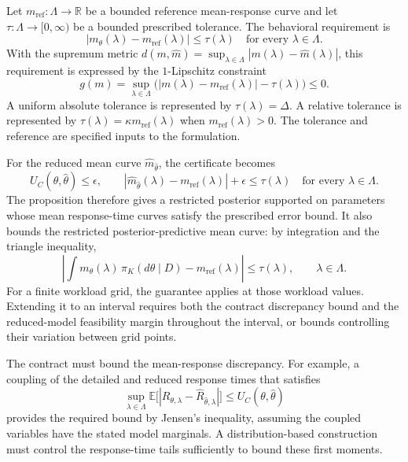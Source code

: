 Let $m_{\mathrm{ref}}:\Lambda\to\mathbb R$ be a bounded reference
mean-response curve and let $\tau:\Lambda\to[0,\infty)$ be a bounded
prescribed tolerance.
The behavioral requirement is
\[
 |m_\theta(\lambda)-m_{\mathrm{ref}}(\lambda)|\leq\tau(\lambda)
 \quad\text{for every }\lambda\in\Lambda.
\]
With the supremum metric
$d(m,\hat m)=\sup_{\lambda\in\Lambda}|m(\lambda)-\hat m(\lambda)|$,
this requirement is expressed by the $1$-Lipschitz constraint
\[
 g(m)=\sup_{\lambda\in\Lambda}
     \bigl(|m(\lambda)-m_{\mathrm{ref}}(\lambda)|-\tau(\lambda)\bigr)
 \leq0.
\]
A uniform absolute tolerance is represented by $\tau(\lambda)=\Delta$.
A relative tolerance is represented by
$\tau(\lambda)=\kappa m_{\mathrm{ref}}(\lambda)$ when
$m_{\mathrm{ref}}(\lambda)>0$. The tolerance and reference are specified
inputs to the formulation.

For the reduced mean curve $\hat m_{\hat\theta}$, the certificate becomes
\[
 U_C(\theta,\hat\theta)\leq\epsilon,\qquad
 |\hat m_{\hat\theta}(\lambda)-m_{\mathrm{ref}}(\lambda)|+\epsilon
       \leq\tau(\lambda)\quad\text{for every }\lambda\in\Lambda.
\]
The proposition therefore gives a restricted posterior supported on
parameters whose mean response-time curves satisfy the prescribed error
bound. It also bounds the restricted posterior-predictive mean curve:
by integration and the triangle inequality,
\[
 \left|\int m_\theta(\lambda)\,\pi_K(d\theta\mid D)
                     -m_{\mathrm{ref}}(\lambda)\right|
 \leq\tau(\lambda),\qquad\lambda\in\Lambda.
\]
For a finite workload grid, the guarantee applies at those workload
values. Extending it to an interval requires both the contract discrepancy
bound and the reduced-model feasibility margin throughout the interval,
or bounds controlling their variation between grid points.

The contract must bound the mean-response discrepancy. For example, a
coupling of the detailed and reduced response times that satisfies
\[
 \sup_{\lambda\in\Lambda}
 \mathbb E\bigl[|R_{\theta,\lambda}-\widehat R_{\hat\theta,\lambda}|\bigr]
 \leq U_C(\theta,\hat\theta)
\]
provides the required bound by Jensen's inequality, assuming the coupled
variables have the stated model marginals. A distribution-based
construction must control the response-time tails sufficiently to bound
these first moments.


